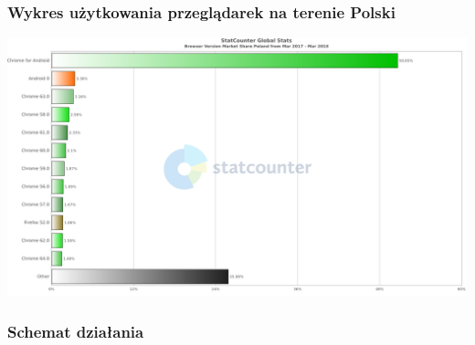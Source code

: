 \documentclass{article}
\begin{document}
\subsubsection{Wykres użytkowania przeglądarek na terenie Polski}
\begin{center}\includegraphics[scale=0.25]{chart}\end{center}

\subsubsection{Schemat działania}
\end{document}
